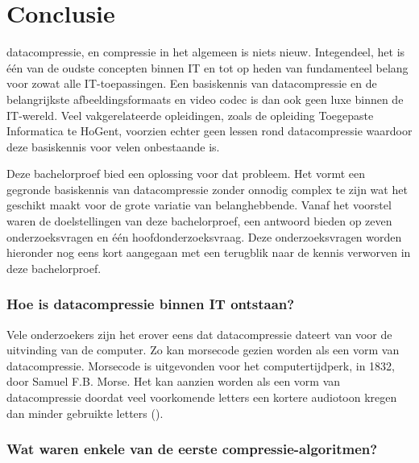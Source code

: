
\chapter{Conclusie}
\label{ch:conclusie}

\Gls{datacompressie}, en compressie in het algemeen is niets nieuw. Integendeel, het is één van de oudste concepten binnen IT en tot op heden van fundamenteel belang voor zowat alle IT-toepassingen. Een basiskennis van \gls{datacompressie} en de belangrijkste \glspl{afbeeldingsformaat} en video \gls{codec} is dan ook geen luxe binnen de IT-wereld. Veel vakgerelateerde opleidingen, zoals de opleiding Toegepaste Informatica te HoGent, voorzien echter geen lessen rond \gls{datacompressie} waardoor deze basiskennis voor velen onbestaande is.

Deze bachelorproef bied een oplossing voor dat probleem. Het vormt een gegronde basiskennis van \gls{datacompressie} zonder onnodig complex te zijn wat het geschikt maakt voor de grote variatie van belanghebbende. Vanaf het voorstel waren de doelstellingen van deze bachelorproef, een antwoord bieden op zeven onderzoeksvragen en één hoofdonderzoeksvraag. Deze onderzoeksvragen worden hieronder nog eens kort aangegaan met een terugblik naar de kennis verworven in deze bachelorproef.

\subsection*{Hoe is datacompressie binnen IT ontstaan?}
\label{sec:conclussie-onderzoeksvraag-1}

Vele onderzoekers zijn het erover eens dat \gls{datacompressie} dateert van voor de uitvinding van de computer. Zo kan morsecode gezien worden als een vorm van \gls{datacompressie}. Morsecode is uitgevonden voor het computertijdperk, in 1832, door Samuel F.B. Morse. Het kan aanzien worden als een vorm van datacompressie doordat veel voorkomende letters een kortere audiotoon kregen dan minder gebruikte letters (\cite{morsecode}).

\subsection*{Wat waren enkele van de eerste compressie-algoritmen?}
\label{sec:conclussie-onderzoeksvraag-2}

